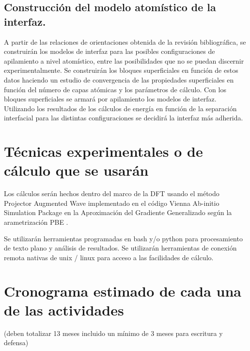 \subsection{ Construcción del modelo atomístico de la interfaz.}

A partir de las relaciones de orientaciones obtenida de la revisión 
bibliográfica, se construirán los modelos de interfaz para las posibles 
configuraciones de apilamiento a nivel atomístico, entre las posibilidades que 
no se puedan discernir experimentalmente. Se construirán los bloques 
superficiales en función de estos datos haciendo un estudio de convergencia de 
las propiedades superficiales en función del número de capas atómicas y los 
parámetros de cálculo. Con los bloques superficiales se armará por apilamiento 
los modelos de interfaz. Utilizando los resultados de los cálculos de energía 
en función de la separación interfacial para las distintas configuraciones 
\cite{Jiangetal} 
se decidirá la interfaz más adherida.

\section{Técnicas experimentales o de cálculo que se usarán}

Los cálculos serán hechos dentro del marco de la DFT \cite{KohnSham65,
HohenbergKohn64} usando el método 
Projector Augmented Wave\cite{Bloch1994,Kresse1999}
implementado en el código Vienna Ab-initio 
Simulation Package\cite{Hafner2007,Hafner2008}
en la Aproximación del Gradiente Generalizado según la 
arametrización PBE \cite{PBE}. 

Se utilizarán herramientas programadas en bash y/o python para procesamiento de 
texto plano y análisis de resultados. Se utilizarán herramientas de conexión 
remota nativas de unix / linux para acceso a las facilidades de cálculo.

\section{Cronograma estimado de cada una de las actividades}

 (deben totalizar 13 
meses incluido un mínimo de 3 meses para escritura y defensa) 


